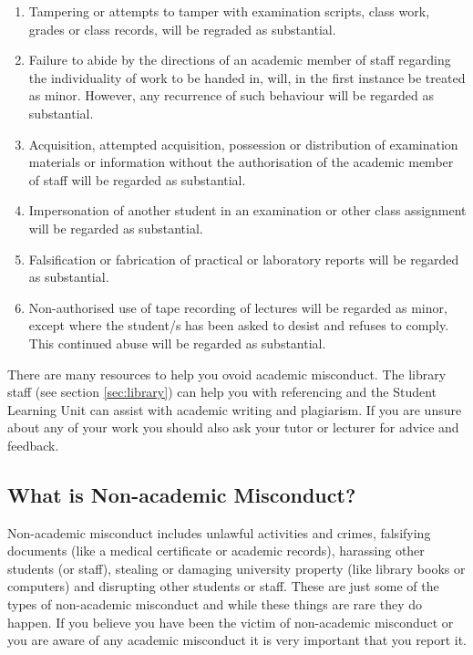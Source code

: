 \documentclass[a4paper,oneside]{book}
\begin{document}
\begin{enumerate}
\item Tampering or attempts to tamper with examination scripts, class
  work, grades or class records, will be regraded as substantial.

\item Failure to abide by the directions of an academic member of
  staff regarding the individuality of work to be handed in, will, in
  the first instance be treated as minor.  However, any recurrence
  of such behaviour will be regarded as substantial.

\item Acquisition, attempted acquisition, possession or distribution
  of examination materials or information without the authorisation of
  the academic member of staff will be regarded as substantial.

\item Impersonation of another student in an examination or other class
assignment will be regarded as substantial.

\item Falsification or fabrication of practical or laboratory reports
will be regarded as substantial.

\item Non-authorised use of tape recording of lectures will be regarded
as minor, except where the student/s has been asked to desist and
refuses to comply.  This continued abuse will be regarded as
substantial.
\end{enumerate}

There are many resources to help you ovoid academic misconduct.  The
library staff (see section \ref{sec:library}) can help you with referencing and the
Student Learning Unit can assist with academic writing and plagiarism.
If you are unsure about any of your work you should also ask your
tutor or lecturer for advice and feedback.

\subsection*{What is Non-academic Misconduct?}

Non-academic misconduct includes unlawful activities and crimes,
falsifying documents (like a medical certificate or academic records),
harassing other students (or staff), stealing or damaging university
property (like library books or computers) and disrupting other
students or staff.  These are just some of the types of non-academic
misconduct and while these things are rare they do happen.  If you
believe you have been the victim of non-academic misconduct or you are
aware of any academic misconduct it is very important that you report
it.
\end{document}
